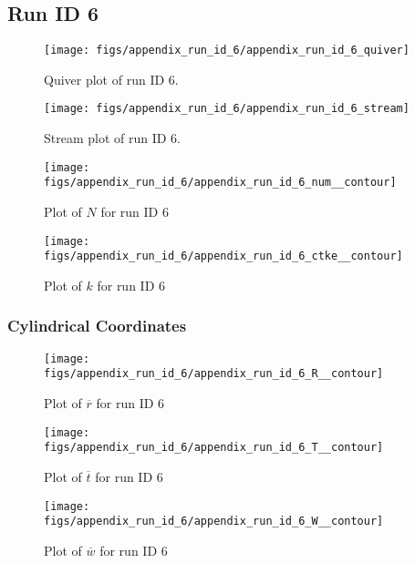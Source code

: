\subsection{Run ID 6}
\begin{figure}[H]
\centering
\texttt{[image: figs/appendix\_run\_id\_6/appendix\_run\_id\_6\_quiver]}
\caption{Quiver plot of run ID 6.}
\label{fig:appendix_run_id_6_quiver}
\end{figure}


\begin{figure}[H]
\centering
\texttt{[image: figs/appendix\_run\_id\_6/appendix\_run\_id\_6\_stream]}
\caption{Stream plot of run ID 6.}
\label{fig:appendix_run_id_6_stream}
\end{figure}


\begin{figure}[H]
\centering
\texttt{[image: figs/appendix\_run\_id\_6/appendix\_run\_id\_6\_num\_\_contour]}
\caption{Plot of $N$ for run ID 6}
\label{fig:appendix_run_id_6_num__contour}
\end{figure}


\begin{figure}[H]
\centering
\texttt{[image: figs/appendix\_run\_id\_6/appendix\_run\_id\_6\_ctke\_\_contour]}
\caption{Plot of $k$ for run ID 6}
\label{fig:appendix_run_id_6_ctke__contour}
\end{figure}


\subsubsection{Cylindrical Coordinates}
\begin{figure}[H]
\centering
\texttt{[image: figs/appendix\_run\_id\_6/appendix\_run\_id\_6\_R\_\_contour]}
\caption{Plot of $\overline{r}$ for run ID 6}
\label{fig:appendix_run_id_6_R__contour}
\end{figure}


\begin{figure}[H]
\centering
\texttt{[image: figs/appendix\_run\_id\_6/appendix\_run\_id\_6\_T\_\_contour]}
\caption{Plot of $\overline{t}$ for run ID 6}
\label{fig:appendix_run_id_6_T__contour}
\end{figure}


\begin{figure}[H]
\centering
\texttt{[image: figs/appendix\_run\_id\_6/appendix\_run\_id\_6\_W\_\_contour]}
\caption{Plot of $\overline{w}$ for run ID 6}
\label{fig:appendix_run_id_6_W__contour}
\end{figure}



